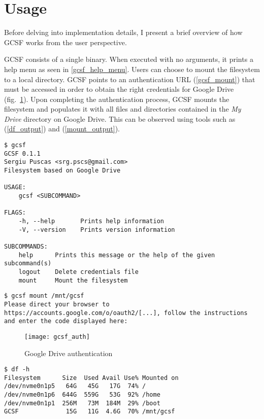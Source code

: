 \section{Usage}

Before delving into implementation details, I present a brief overview of how GCSF works from the user perspective.

GCSF consists of a single binary. When executed with no arguments, it prints a help menu as seen in \ref{gcsf_help_menu}. Users can choose to mount the filesystem to a local directory. GCSF points to an authentication URL (\ref{gcsf_mount}) that must be accessed in order to obtain the right credentials for Google Drive (fig.~\ref{fig:drive_auth}). Upon completing the authentication process, GCSF mounts the filesystem and populates it with all files and directories contained in the \emph{My Drive} directory on Google Drive. This can be observed using tools such as  (\ref{df_output}) and  (\ref{mount_output}).

\begin{lstlisting}[caption=GCSF help menu, frame=single, label=gcsf_help_menu]
$ gcsf
GCSF 0.1.1
Sergiu Puscas <srg.pscs@gmail.com>
Filesystem based on Google Drive

USAGE:
    gcsf <SUBCOMMAND>

FLAGS:
    -h, --help       Prints help information
    -V, --version    Prints version information

SUBCOMMANDS:
    help      Prints this message or the help of the given subcommand(s)
    logout    Delete credentials file
    mount     Mount the filesystem
\end{lstlisting}

\begin{lstlisting}[caption=GCSF mount, frame=single, label=gcsf_mount]
$ gcsf mount /mnt/gcsf
Please direct your browser to https://accounts.google.com/o/oauth2/[...], follow the instructions and enter the code displayed here:
\end{lstlisting}

\begin{figure}[bpt]
\caption{Google Drive authentication}
\label{fig:drive_auth}
\centering
\texttt{[image: gcsf\_auth]}
\end{figure}

\begin{lstlisting}[caption=List of mounted filesystems, frame=single, label=df_output]
$ df -h
Filesystem      Size  Used Avail Use% Mounted on
/dev/nvme0n1p5   64G   45G   17G  74% /
/dev/nvme0n1p6  644G  559G   53G  92% /home
/dev/nvme0n1p1  256M   73M  184M  29% /boot
GCSF             15G   11G  4.6G  70% /mnt/gcsf
\end{lstlisting}


